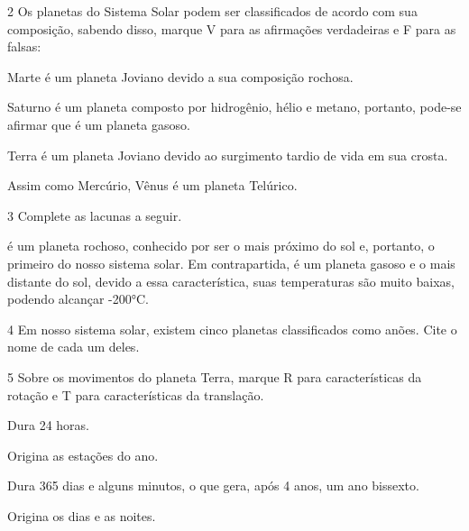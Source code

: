 {{\num{2} Os planetas do Sistema Solar podem ser classificados de acordo com sua
  composição, sabendo disso, marque V para as afirmações verdadeiras e F
  para as falsas:

\begin{boxlist}
\item Marte é um planeta Joviano devido a sua composição rochosa. 

\item Saturno é um planeta composto por hidrogênio, hélio e metano,
portanto, pode-se afirmar que é um planeta gasoso. 

\item Terra é um planeta Joviano devido ao surgimento tardio de vida em
sua crosta. 

\item Assim como Mercúrio, Vênus é um planeta Telúrico. 
\end{boxlist}

\num{3}  Complete as lacunas a seguir.

\preencher é um planeta rochoso, conhecido por ser
o mais próximo do sol e, portanto, o primeiro do nosso sistema solar. Em
contrapartida, \preencher é um planeta gasoso e o mais distante
do sol, devido a essa característica, suas temperaturas são muito
baixas, podendo alcançar -200°C. 

\num{4}  Em nosso sistema solar, existem cinco planetas classificados como anões. Cite o nome de cada um deles.



\num{5}  Sobre os movimentos do planeta Terra, marque R para características da rotação e T para características da translação.

\begin{boxlist}
\item Dura 24 horas. 

\item Origina as estações do ano. 

\item Dura 365 dias e alguns minutos, o que gera, após 4 anos, um ano
bissexto. 

\item Origina os dias e as noites. 
\end{boxlist}

}}

